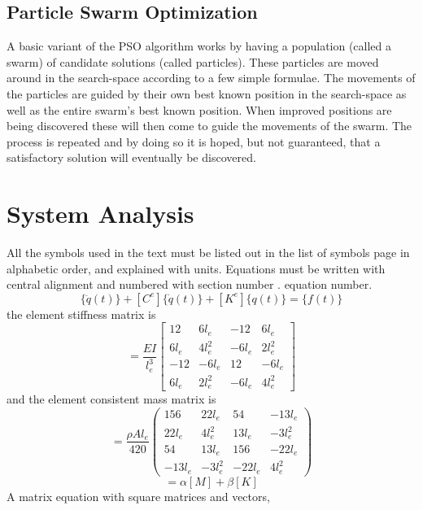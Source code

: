\documentclass[BTech]{srmuthesis}
\begin{document}
\section{Particle Swarm Optimization}
A basic variant of the \ac{PSO} \citep{kenndy} algorithm works by having a population (called a swarm) of candidate solutions (called particles). These particles are moved around in the search-space according to a few simple formulae. The movements of the particles are guided by their own best known position in the search-space as well as the entire swarm's best known position. When improved positions are being discovered these will then come to guide the movements of the swarm. The process is repeated and by doing so it is hoped, but not guaranteed, that a satisfactory solution will eventually be discovered.
\chapter{System Analysis}
All the symbols used in the text must be listed out in the list of symbols page in alphabetic order, and explained with units. Equations must be written with central alignment and numbered with section number . equation number. 
\begin{equation}
[M^e]\{\ddot{q}(t)\}+[C^e]\{\dot{q}(t)\}+[K^e]\{q(t)\}=\{f(t)\}
\label{eq:mkceqn}
\end{equation}  
the element stiffness matrix is
\begin{equation}
[K^e]=\frac{EI}{l_e^3}\begin{bmatrix}
12&6l_e &-12&6l_e\\
6l_e&4l_e^2&-6l_e&2l_e^2\\
-12&-6l_e&12&-6l_e\\
6l_e&2l_e^2&-6l_e&4l_e^2
\end{bmatrix}
\label{eq:sm}
\end{equation}
and the element consistent mass matrix is
\begin{equation}
[M^e]=\frac{\rho Al_e}{420}\begin{pmatrix}
156&22l_e &54&-13l_e\\
22l_e&4l_e^2&13l_e&-3l_e^2\\
54&13l_e&156&-22l_e\\
-13l_e&-3l_e^2&-22l_e&4l_e^2
\end{pmatrix}
\label{eq:cmm}
\end{equation}
\begin{equation}
[C]=\alpha[M]+\beta[K]
\end{equation}
A matrix equation with square matrices and vectors,
\end{document}
